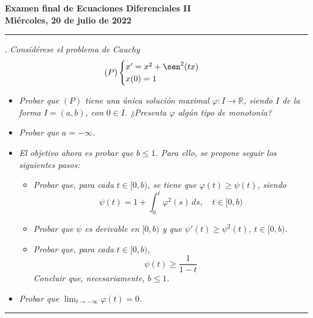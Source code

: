 \documentclass[11pt]{report}
\newcommand{\R}{\mathbb R}
\begin{document}
\begin{center}
    \textbf{Examen final de Ecuaciones Diferenciales II} \\
    \textbf{Miércoles, 20 de julio de 2022}
\end{center}

\hrule

\vspace{4mm}

. \textit{Considérese el problema de Cauchy}
\[(P) \begin{cases}
    x'=x^2+\sen^2(tx) \\
    x(0)=1
\end{cases}\]
\begin{itemize}
    \item[\textit{(a)}] \textit{Probar que $(P)$ tiene una única solución maximal $\varphi \colon I \to \R$, siendo $I$ de la forma $I=(a,b)$, con $0 \in I$. ¿Presenta $\varphi$ algún tipo de monotonía?}
    \item[\textit{(b)}] \textit{Probar que $a=-\infty$.}
    \item[\textit{(c)}] \textit{El objetivo ahora es probar que $b \leq 1$. Para ello, se propone seguir los siguientes pasos:}
    \begin{itemize}
        \item[\textit{(i)}] \textit{Probar que, para cada $t \in [0,b)$, se tiene que $\varphi(t) \geq \psi(t)$, siendo}
        \[\psi(t)=1+\int_0^t \varphi^2(s)\, ds, \quad t \in [0,b)\]
        \item[\textit{(ii)}] \textit{Probar que $\psi$ es derivable en $[0,b)$ y que $\psi'(t) \geq \psi^2(t)$, $t \in [0,b)$.}
        \item[\textit{(iii)}] \textit{Probar que, para cada $t \in [0,b)$,}
        \[\psi(t) \geq \frac{1}{1-t}\]
        \textit{Concluir que, necesariamente, $b \leq 1$.}
    \end{itemize}
    \item[\textit{(d)}] \textit{Probar que $\displaystyle \lim_{t \to -\infty} \varphi(t) = 0$.}
\end{itemize}

\vspace{2mm}

\hrule

\vspace{4mm}
\end{document}
